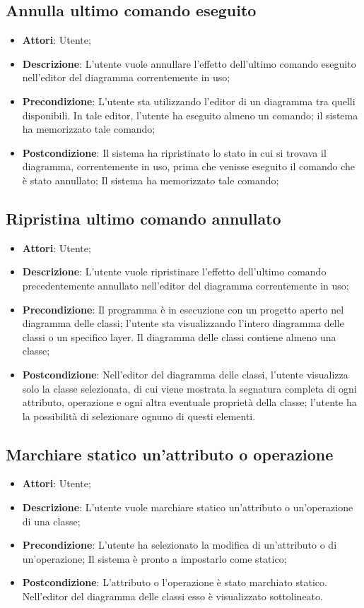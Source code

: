 \documentclass[../AnalisiDeiRequisiti.tex]{subfiles}
\begin{document}
	\subsection{Annulla ultimo comando eseguito}
	\begin{itemize}
		\item \textbf{Attori}: Utente;
		\item \textbf{Descrizione}: L'utente vuole annullare l'effetto dell'ultimo comando eseguito nell'editor del diagramma correntemente in uso;
		\item \textbf{Precondizione}: L'utente sta utilizzando l'editor di un diagramma tra quelli disponibili. In tale editor, l'utente ha eseguito almeno un comando; il sistema ha memorizzato tale comando;
		\item \textbf{Postcondizione}: Il sistema ha ripristinato lo stato in cui si trovava il diagramma, correntemente in uso, prima che venisse eseguito il comando che è stato annullato; Il sistema ha memorizzato tale comando;
	\end{itemize}		

	\subsection{Ripristina ultimo comando annullato}
	\begin{itemize}
		\item \textbf{Attori}: Utente;
		\item \textbf{Descrizione}: L'utente vuole ripristinare l'effetto dell'ultimo comando precedentemente annullato nell'editor del diagramma correntemente in uso;
		\item \textbf{Precondizione}: Il programma è in esecuzione con un progetto aperto nel diagramma delle classi; l'utente sta visualizzando l'intero diagramma delle classi o un specifico layer. Il diagramma delle classi contiene almeno una classe;
		\item \textbf{Postcondizione}: Nell'editor del diagramma delle classi, l'utente visualizza solo la classe selezionata, di cui viene mostrata la segnatura completa di ogni attributo, operazione e ogni altra eventuale proprietà della classe; l'utente ha la possibilità di selezionare ognuno di questi elementi.
	\end{itemize}	
	
		
	
		
	\subsection{Marchiare statico un'attributo o operazione}
	\begin{itemize}
		\item \textbf{Attori}: Utente;
		\item \textbf{Descrizione}: L'utente vuole marchiare statico un'attributo o un'operazione di una classe;
		\item \textbf{Precondizione}: L'utente ha selezionato la modifica di un'attributo o di un'operazione; Il sistema è pronto a impostarlo come statico;
		\item \textbf{Postcondizione}: L'attributo o l'operazione è stato marchiato statico. Nell'editor del diagramma delle classi esso è visualizzato sottolineato.
	\end{itemize}		
			
\end{document}

